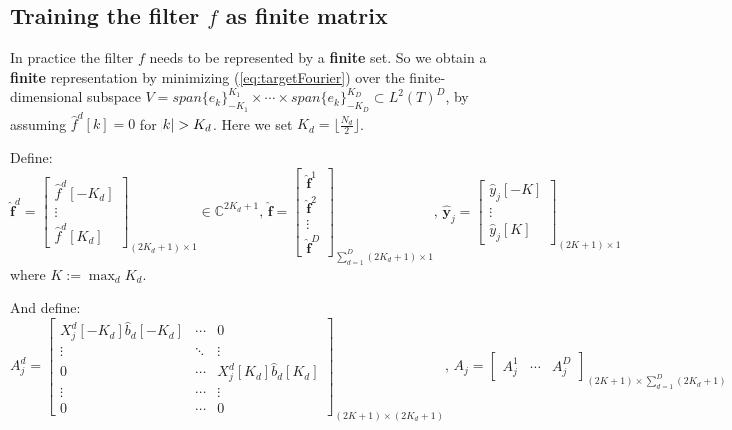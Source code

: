 \documentclass[12pt]{article}
\numberwithin{equation}{section}
\begin{document}
\subsection{Training the filter $f$ as finite matrix}
In practice the filter $f$ needs to be represented by a \textbf{finite} set. So we obtain a \textbf{finite} representation by minimizing (\ref{eq:targetFourier}) over the finite-dimensional subspace $V = span\{e_k\}^{K_1}_{-K_1} \times \cdots \times span\{e_k\}^{K_D}_{-K_D} \subset L^2(T)^D$, by assuming $\hat{f}^d[k] = 0$ for $\abs{k} > K_d$. Here we set $K_d = \lfloor \frac{N_d}{2} \rfloor$. \par
Define: 
\begin{equation}
	\hat{\bm{f}}^d= 
	\begin{bmatrix}
		\hat{f}^d[-K_d] \\  \vdots \\ \hat{f}^d[K_d] 
	\end{bmatrix}_{(2K_d+1) \times 1}
	 \in \mathbb{C}^{2K_d+1} \text{,   }
	\hat{\bm{f}}= 
	\begin{bmatrix}
		\hat{\bm{f}}^1 \\ \hat{\bm{f}}^2 \\ \vdots \\ \hat{\bm{f}}^D
	\end{bmatrix}_{\sum^{D}_{d=1}(2K_d+1) \times 1}
	 \text{,   }
	 \hat{\bm{y}}_j= 
	\begin{bmatrix}
		\hat{y}_j[-K] \\  \vdots \\ \hat{y}_j[K] 
	\end{bmatrix}_{(2K+1) \times 1}
\end{equation}
where $K:=\max_dK_d$.  \par
And define: 
\begin{equation}
	A^d_j = 
	\begin{bmatrix}
		X^d_j[-K_d]\hat{b}_d[-K_d] & \cdots & 0 \\
		\vdots & \ddots & \vdots \\
		0 & \cdots & X^d_j[K_d]\hat{b}_d[K_d] \\
		\vdots & \cdots & \vdots \\
		0 & \cdots & 0
	\end{bmatrix}_{(2K+1)\times(2K_d+1)}
	 \text{,   }
	A_j = 
	\begin{bmatrix}
		A_j^1 & \cdots & A_j^D
	\end{bmatrix}_{(2K+1)\times \sum^{D}_{d=1}(2K_d+1)}
\end{equation} \par
\end{document}
